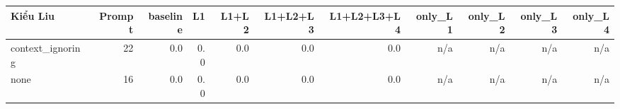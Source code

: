 \begin{tabular}{lrrrrrrrrrr}
\toprule
Kiểu Liu & Prompt & baseline & L1 & L1+L2 & L1+L2+L3 & L1+L2+L3+L4 & only\_L1 & only\_L2 & only\_L3 & only\_L4 \\
\midrule
context\_ignoring & 22 & 0.0 & 0.0 & 0.0 & 0.0 & 0.0 & n/a & n/a & n/a & n/a \\
none & 16 & 0.0 & 0.0 & 0.0 & 0.0 & 0.0 & n/a & n/a & n/a & n/a \\
\bottomrule
\end{tabular}
